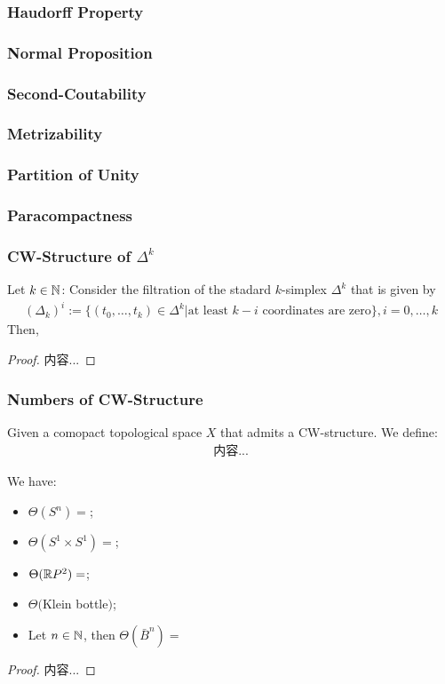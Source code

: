 \documentclass[Total.tex]{subfiles}
\begin{document}
		\subsubsection{Haudorff Property}
		\subsubsection{Normal Proposition}
		\subsubsection{Second-Coutability}
		\subsubsection{Metrizability}
		\subsubsection{Partition of Unity}
		\subsubsection{Paracompactness}
		\subsubsection{CW-Structure of $\Delta^k$}
		\begin{proposition}
			Let $k\in \mathbb{N}$: Consider the filtration of the stadard $k$-simplex $\Delta^k$ that is given by
			\begin{gather*}
				(\Delta_k)^i:=\{(t_0,\dots,t_k)\in \Delta^k|\mbox{at least }k-i\mbox{ coordinates are zero}\},i=0,\dots,k
			\end{gather*}
			Then, 
		\end{proposition}
		\begin{proof}
			内容...
		\end{proof}
		\subsubsection{Numbers of CW-Structure}
		\begin{Def}
			Given a comopact topological space $X$ that admits a CW-structure. We define:
			\begin{gather*}
				内容...
			\end{gather*}
		\end{Def}
		\begin{proposition}
			We have:
			\begin{itemize}
				\item $\Theta(S^n)=$;
				\item $\Theta(S^1\times S^1)=$;
				\item $\Theta(\mathbb{R} P^2)=$;
				\item $\Theta($Klein bottle$)$;
				\item Let $n\in \mathbb{N}$, then $\Theta(\bar{B}^n)=$
			\end{itemize}
		\end{proposition}
		\begin{proof}
			内容...
		\end{proof}
\end{document}
